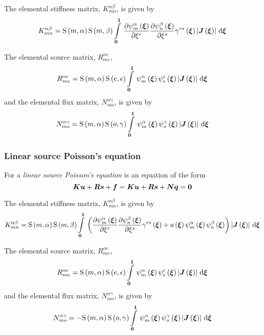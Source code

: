 The elemental stiffness matrix, $K^{\alpha\beta}_{mn}$, is given by
\begin{equation}
  K^{\alpha\beta}_{mn}=\gsf{m}{\alpha}\gsf{m}{\beta}
  \gint{\vectr{0}}{\vectr{1}}{\delby{\gbfn{m}{\alpha}{\vectr{\xi}}}{\xi^{r}}
    \delby{\gbfn{n}{\beta}{\vectr{\xi}}}{\xi^{s}}\fnof{\gamma^{rs}}{\vectr{\xi}}
    \abs{\fnof{\matr{J}}{\vectr{\xi}}}}{\vectr{\xi}}
  \label{eqn:elementalfemlhs2}
\end{equation}

The elemental source matrix, $R^{\alpha\epsilon}_{me}$, 
\begin{equation}
  R^{\alpha\epsilon}_{me}=\gsf{m}{\alpha}\gsf{e}{\epsilon}
  \gint{\vectr{0}}{\vectr{1}}{\gbfn{m}{\alpha}{\vectr{\xi}}\gbfn{e}{\epsilon}{\vectr{\xi}}
    \abs{\fnof{\matr{J}}{\vectr{\xi}}}}{\vectr{\xi}}
\end{equation}
and the elemental flux matrix, $N^{\alpha\gamma}_{mo}$, is given by
\begin{equation}
  N^{\alpha\gamma}_{mo} =\gsf{m}{\alpha}\gsf{o}{\gamma}
  \gint{\vectr{0}}{\vectr{1}}{\gbfn{m}{\alpha}{\vectr{\xi}}\gbfn{o}{\gamma}{\vectr{\xi}}
    \abs{\fnof{\matr{J}}{\vectr{\xi}}}}{\vectr{\xi}}
\end{equation}

\subsubsection{Linear source Poisson's equation}

For a \emph{linear source Poisson's equation}
  is an equation of the form
\begin{equation}
  \matr{K}\vect{u}+\matr{R}\vect{s}+\vect{f}=\matr{K}\vect{u}+\matr{R}\vect{s}+\matr{N}\vect{q}=\vect{0}
\end{equation}

The elemental stiffness matrix, $K^{\alpha\beta}_{mn}$, is given by
\begin{equation}
  K^{\alpha\beta}_{mn}=\gsf{m}{\alpha}\gsf{m}{\beta}
  \gint{\vectr{0}}{\vectr{1}}{\pbrac{\delby{\gbfn{m}{\alpha}{\vectr{\xi}}}{\xi^{r}}
      \delby{\gbfn{n}{\beta}{\vectr{\xi}}}{\xi^{s}}\fnof{\gamma^{rs}}{\vectr{\xi}}+
      \fnof{a}{\vectr{\xi}}\gbfn{m}{\alpha}{\vectr{\xi}}\gbfn{n}{\beta}{\vectr{\xi}}}
    \abs{\fnof{\matr{J}}{\vectr{\xi}}}}{\vectr{\xi}}
  \label{eqn:elementalfemlhs2}
\end{equation}

The elemental source matrix, $R^{\alpha\epsilon}_{me}$, 
\begin{equation}
  R^{\alpha\epsilon}_{me}=\gsf{m}{\alpha}\gsf{e}{\epsilon}
  \gint{\vectr{0}}{\vectr{1}}{\gbfn{m}{\alpha}{\vectr{\xi}}\gbfn{e}{\epsilon}{\vectr{\xi}}
    \abs{\fnof{\matr{J}}{\vectr{\xi}}}}{\vectr{\xi}}
\end{equation}
and the elemental flux matrix, $N^{\alpha\gamma}_{mo}$, is given by
\begin{equation}
  N^{\alpha\gamma}_{mo} =-\gsf{m}{\alpha}\gsf{o}{\gamma}
  \gint{\vectr{0}}{\vectr{1}}{\gbfn{m}{\alpha}{\vectr{\xi}}\gbfn{o}{\gamma}{\vectr{\xi}}
    \abs{\fnof{\matr{J}}{\vectr{\xi}}}}{\vectr{\xi}}
\end{equation}

